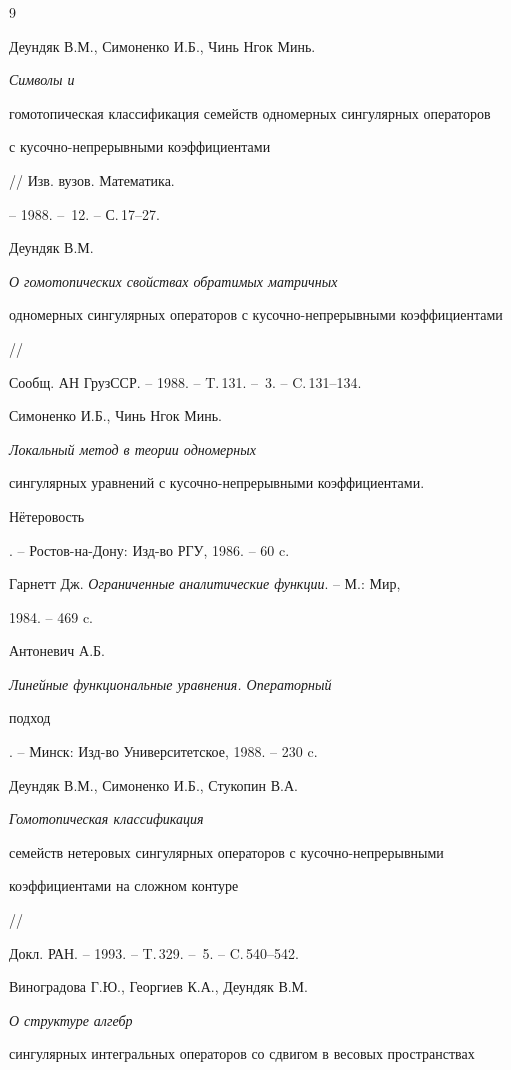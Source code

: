 \begin{thebibliography}{9}







Деундяк В.М., Симоненко И.Б., Чинь Нгок Минь. {\em Символы и


гомотопическая классификация семейств одномерных сингулярных операторов


с кусочно-непрерывными коэффициентами} // Изв. вузов. Математика.


-- 1988. -- \No\,12. -- С.\,17--27.




Деундяк В.М. {\em О гомотопических свойствах обратимых матричных


одномерных сингулярных операторов с кусочно-непрерывными коэффициентами} //


Сообщ. АН ГрузССР. -- 1988. -- T.\,131. -- \No\,3. -- C.\,131--134.




Симоненко И.Б., Чинь Нгок Минь. {\em Локальный метод в теории одномерных


сингулярных уравнений с кусочно-непрерывными коэффициентами. 


Н\"етеровость}. -- Ростов-на-Дону: Изд-во РГУ, 1986. -- 60 c.




Гарнетт Дж. {\em Ограниченные аналитические функции}. -- М.: Мир, 


1984. -- 469 c.




Антоневич А.Б. {\em Линейные функциональные уравнения. Операторный


подход}. -- Минск: Изд-во Университетское, 1988. -- 230 c.




Деундяк В.М., Симоненко И.Б., Стукопин В.А. {\em Гомотопическая классификация


семейств нетеровых сингулярных операторов с кусочно-непрерывными


коэффициентами на сложном контуре} //


Докл. РАН. -- 1993. -- T.\,329. -- \No\,5. -- C.\,540--542.




Виноградова Г.Ю., Георгиев К.А., Деундяк В.М. {\em О структуре алгебр


сингулярных интегральных операторов со сдвигом в весовых пространствах


}
\end{thebibliography}
